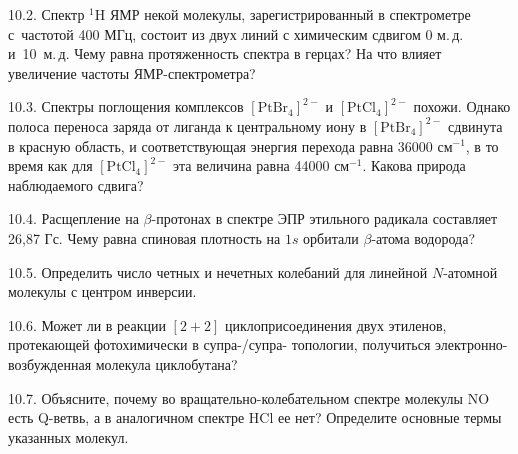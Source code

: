10.2. Спектр $^{1}$H ЯМР некой молекулы, зарегистрированный в спектрометре с~частотой 400 МГц, состоит из двух линий с химическим сдвигом 0 м.\,д. и~10~м.\,д. Чему равна протяженность спектра в герцах? На что влияет увеличение частоты ЯМР-спектрометра?\par
10.3. Спектры поглощения комплексов $[\text{PtBr}_4]^{2-}$ и $[\text{PtCl}_4]^{2-}$ похожи. Однако полоса переноса заряда от лиганда к центральному иону в $[\text{PtBr}_4]^{2-}$ сдвинута в красную область, и соответствующая энергия перехода равна 36000 см$^{-1}$, в то время как для $[\text{PtCl}_4]^{2-}$ эта величина равна 44000 см$^{-1}$. Какова природа наблюдаемого сдвига?\par
10.4. Расщепление на $\beta$-протонах в спектре ЭПР этильного радикала составляет 26,87 Гс. Чему равна спиновая плотность на $1s$ орбитали $\beta$-атома водорода?\par
10.5. Определить число четных и нечетных колебаний для линейной $N$-атомной молекулы с центром инверсии.\par
10.6. Может ли в реакции $[2+2]$ циклоприсоединения двух этиленов, протекающей фотохимически в супра-/супра- топологии, получиться электронно-возбужденная молекула циклобутана?\par
10.7. Объясните, почему во вращательно-колебательном спектре молекулы NO есть Q-ветвь, а в аналогичном спектре HCl ее нет? Определите основные термы указанных молекул.\par


